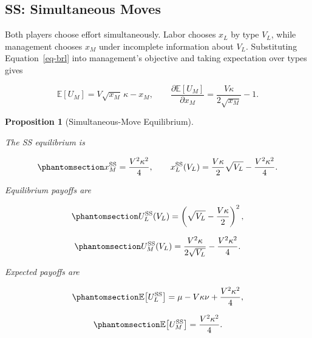 \documentclass[
  english,
  a4paper,
  12pt]{article}
\newcommand{\E}{\mathbb{E}}
\theoremstyle{plain}
\newtheorem{proposition}{Proposition}[section]
\theoremstyle{plain}
\theoremstyle{definition}
\theoremstyle{remark}
\begin{document}
\subsection{SS: Simultaneous Moves}\label{sec-ss}

Both players choose effort simultaneously. Labor chooses \(x_L\) by type
\(V_L\), while management chooses \(x_M\) under incomplete information
about \(V_L\). Substituting Equation~\ref{eq-brl} into management's
objective and taking expectation over types gives

\[
\E[U_M] = V\sqrt{x_M}\,\kappa - x_M,
\qquad
\frac{\partial \E[U_M]}{\partial x_M}
  = \frac{V\kappa}{2\sqrt{x_M}} - 1.
\]

\begin{proposition}[Simultaneous-Move
Equilibrium]\protect\hypertarget{prp-ss}{}\label{prp-ss}

The SS equilibrium is

\begin{equation}\phantomsection\label{eq-ss-efforts}{
x_M^{\mathrm{SS}} = \frac{V^2\kappa^2}{4}, \qquad
x_L^{\mathrm{SS}}(V_L)
  = \frac{V\kappa}{2}\sqrt{V_L} - \frac{V^2\kappa^2}{4}.
}\end{equation}

Equilibrium payoffs are

\begin{equation}\phantomsection\label{eq-ul-ss}{
U_L^{\mathrm{SS}}(V_L)
  = \left(\sqrt{V_L} - \frac{V\kappa}{2}\right)^2,
}\end{equation}

\begin{equation}\phantomsection\label{eq-um-ss}{
U_M^{\mathrm{SS}}(V_L)
  = \frac{V^2\kappa}{2\sqrt{V_L}} - \frac{V^2\kappa^2}{4}.
}\end{equation}

Expected payoffs are

\begin{equation}\phantomsection\label{eq-eul-ss}{
\E\!\left[U_L^{\mathrm{SS}}\right]
  = \mu - V\kappa\nu + \frac{V^2\kappa^2}{4},
}\end{equation}

\begin{equation}\phantomsection\label{eq-eum-ss}{
\E\!\left[U_M^{\mathrm{SS}}\right]
  = \frac{V^2\kappa^2}{4}.
}\end{equation}

\end{proposition}
\end{document}
